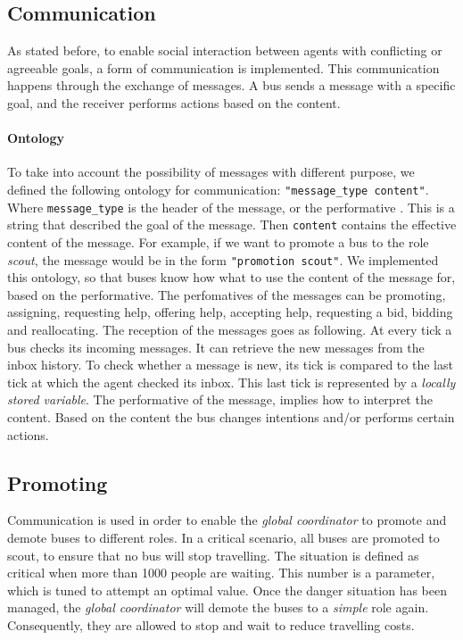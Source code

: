 \documentclass{article}
\begin{document}
\subsection{Communication}
As stated before, to enable social interaction between agents with conflicting or agreeable goals, a form of communication is implemented. This communication happens through the exchange of messages. A bus sends a message with a specific goal, and the receiver performs actions based on the content.
\paragraph{Ontology}
To take into account the possibility of messages with different purpose, we defined the following ontology for communication: \texttt{"message\_type content"}. Where  \texttt{message\_type} is the header of the message, or the performative \cite{fipa}. This is a string that described the goal of the message. Then \texttt{content} contains the effective content of the message. For example, if we want to promote a bus to the role \textit{scout}, the message would be in the form \texttt{"promotion scout"}. We implemented this ontology, so that buses know how what to use the content of the message for, based on the performative. The perfomatives of the messages can be promoting, assigning, requesting help, offering help, accepting help, requesting a bid, bidding and reallocating. 
\newline
The reception of the messages goes as following. At every tick a bus checks its incoming messages. It can retrieve the new messages from the inbox history. To check whether a message is new, its tick is compared to the last tick at which the agent checked its inbox. This last tick is represented by a \textit{locally stored variable}. The performative of the message, implies how to interpret the content. Based on the content the bus changes intentions and/or performs certain actions.

\subsection{Promoting}
Communication is used in order to enable the \textit{global coordinator} to promote and demote buses to different roles. In a critical scenario, all buses are promoted to scout, to ensure that no bus will stop travelling. The situation is defined as critical when more than 1000 people are waiting. This number is a parameter, which is tuned to attempt an optimal value.
Once the danger situation has been managed, the \textit{global coordinator} will demote the buses to a \textit{simple} role again. Consequently, they are allowed to stop and wait to reduce travelling costs.
\end{document}
